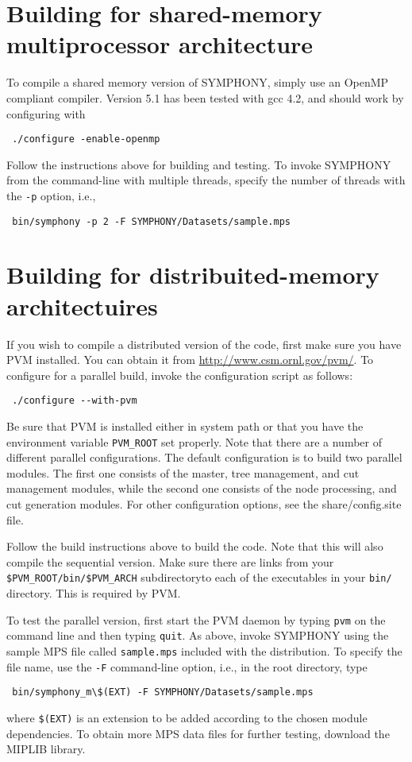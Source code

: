 \section{Building for shared-memory multiprocessor architecture}

To compile a shared memory version of SYMPHONY, simply use an OpenMP compliant
compiler. Version 5.1 has been tested with gcc 4.2, and should work by
configuring with
{\color{Brown}
\begin{verbatim}
 ./configure -enable-openmp
\end{verbatim}
}
Follow the instructions above for building and testing. To invoke SYMPHONY
from the command-line with multiple threads, specify the number of threads
with the \texttt{-p} option, i.e.,
{\color{Brown}
\begin{verbatim}
 bin/symphony -p 2 -F SYMPHONY/Datasets/sample.mps
\end{verbatim}
}
\section{Building for distribuited-memory architectuires}

If you wish to compile a distributed version of the code, first make sure
you have PVM installed. You can obtain it from
\url{http://www.csm.ornl.gov/pvm/}. To configure for a parallel build, invoke
the configuration script as follows:
{\color{Brown}
\begin{verbatim}
 ./configure --with-pvm
\end{verbatim}
}
Be sure that PVM is installed either in system path or that you have the
environment variable \texttt{PVM\_ROOT} set properly. Note that there are a
number of different parallel configurations. The default configuration is to
build two parallel modules. The first one consists of the master, tree
management, and cut management modules, while the second one consists of the
node processing, and cut generation modules. For other configuration options,
see the share/config.site file.

Follow the build instructions above to build the code. Note that this will
also compile the sequential version. Make sure there are links from your
\texttt{\$PVM\_ROOT/bin/\$PVM\_ARCH} subdirectoryto each of the executables in
your \texttt{bin/} directory. This is required by PVM.

To test the parallel version, first start the PVM daemon by typing
\texttt{pvm} on the command line and then typing \texttt{quit}. As above,
invoke SYMPHONY using the sample MPS file called \texttt{sample.mps} included
with the distribution. To specify the file name, use the \texttt{-F}
command-line option, i.e., in the root directory, type
{\color{Brown}
\begin{verbatim}
 bin/symphony_m\$(EXT) -F SYMPHONY/Datasets/sample.mps 
\end{verbatim}
}
where \texttt{\$(EXT)} is an extension to be added according to the chosen
module dependencies. To obtain more MPS data files for further testing,
download the MIPLIB library.

